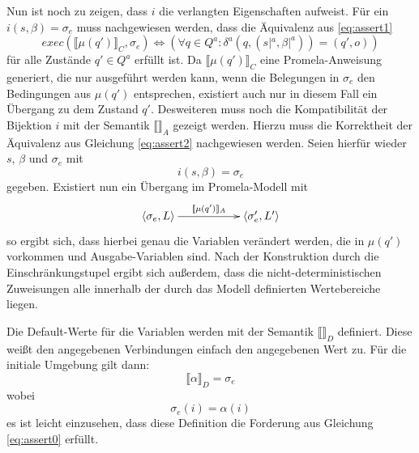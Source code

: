 Nun ist noch zu zeigen, dass $i$ die verlangten Eigenschaften aufweist.
Für ein $i(s,\beta)=\sigma_e$ muss nachgewiesen werden, dass die Äquivalenz aus \ref{eq:assert1}
\[ \mathit{exec}(\llbracket \mu(q')\rrbracket_C,\sigma_e)\Leftrightarrow (\forall q\in Q^a: \delta^a(q,(s|^a,\beta|^a)) = (q',o)) \]
für alle Zustände $q'\in Q^a$ erfüllt ist.
Da $\llbracket\mu(q')\rrbracket_C$ eine Promela-Anweisung generiert, die nur ausgeführt werden kann, wenn die Belegungen in $\sigma_e$ den Bedingungen aus $\mu(q')$ entsprechen, existiert auch nur in diesem Fall ein Übergang zu dem Zustand $q'$.
Desweiteren muss noch die Kompatibilität der Bijektion $i$ mit der Semantik $\llbracket\rrbracket_A$ gezeigt werden.
Hierzu muss die Korrektheit der Äquivalenz aus Gleichung \ref{eq:assert2} nachgewiesen werden.
Seien hierfür wieder $s$, $\beta$ und $\sigma_e$ mit 
\[ i(s,\beta) = \sigma_e \]
gegeben.
Existiert nun ein Übergang im Promela-Modell mit
\[ \xymatrix{ \left<\sigma_e,L\right> \ar[rr]^-{\llbracket \mu(q')\rrbracket_A} & & \left<\sigma_e',L'\right> } \]
so ergibt sich, dass hierbei genau die Variablen verändert werden, die in $\mu(q')$ vorkommen und Ausgabe-Variablen sind.
Nach der Konstruktion durch die Einschränkungstupel ergibt sich außerdem, dass die nicht-deterministischen Zuweisungen alle innerhalb der durch das Modell definierten Wertebereiche liegen.

Die Default-Werte für die Variablen werden mit der Semantik $\llbracket\rrbracket_D$ definiert.
Diese weißt den angegebenen Verbindungen einfach den angegebenen Wert zu.
Für die initiale Umgebung gilt dann:
\[ \llbracket \alpha\rrbracket_D = \sigma_e \]
wobei
\[ \sigma_e(i) = \alpha(i) \]
es ist leicht einzusehen, dass diese Definition die Forderung aus Gleichung \ref{eq:assert0} erfüllt.